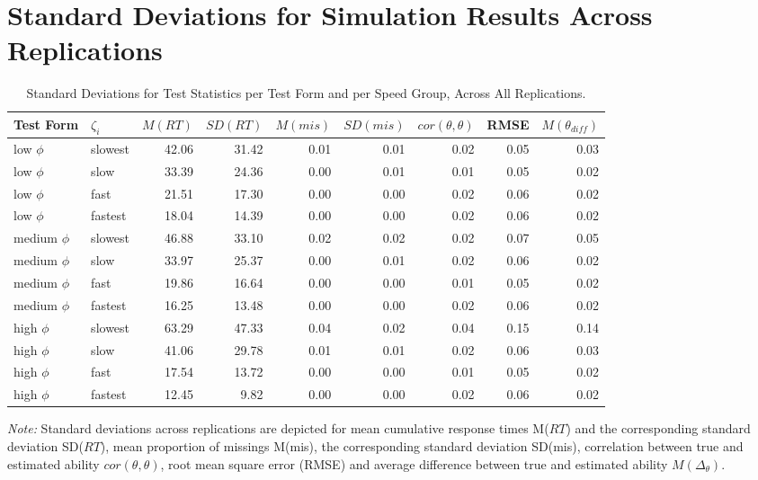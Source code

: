 \documentclass[a4paper,man,apacite,donotrepeattitle]{apa6}
\begin{document}
\section{Standard Deviations for Simulation Results Across Replications}
\begin{table}
\centering
\caption{Standard Deviations for Test Statistics per Test Form and per Speed Group, Across All Replications.}
\begin{tabular}{llrrrrrrr}
  \hline
Test Form & $\zeta_{i}$ & $M(RT)$ & $SD(RT)$ & $M(mis)$ & $SD(mis)$ & $cor(\theta, \theta)$ & RMSE & $M(\theta_{diff})$ \\ 
  \hline
low $\phi$ & slowest & 42.06 & 31.42 & 0.01 & 0.01 & 0.02 & 0.05 & 0.03 \\ 
  low $\phi$ & slow & 33.39 & 24.36 & 0.00 & 0.01 & 0.01 & 0.05 & 0.02 \\ 
  low $\phi$ & fast & 21.51 & 17.30 & 0.00 & 0.00 & 0.02 & 0.06 & 0.02 \\ 
  low $\phi$ & fastest & 18.04 & 14.39 & 0.00 & 0.00 & 0.02 & 0.06 & 0.02 \\ 
  medium $\phi$ & slowest & 46.88 & 33.10 & 0.02 & 0.02 & 0.02 & 0.07 & 0.05 \\ 
  medium $\phi$ & slow & 33.97 & 25.37 & 0.00 & 0.01 & 0.02 & 0.06 & 0.02 \\ 
  medium $\phi$ & fast & 19.86 & 16.64 & 0.00 & 0.00 & 0.01 & 0.05 & 0.02 \\ 
  medium $\phi$ & fastest & 16.25 & 13.48 & 0.00 & 0.00 & 0.02 & 0.06 & 0.02 \\ 
  high $\phi$ & slowest & 63.29 & 47.33 & 0.04 & 0.02 & 0.04 & 0.15 & 0.14 \\ 
  high $\phi$ & slow & 41.06 & 29.78 & 0.01 & 0.01 & 0.02 & 0.06 & 0.03 \\ 
  high $\phi$ & fast & 17.54 & 13.72 & 0.00 & 0.00 & 0.01 & 0.05 & 0.02 \\ 
  high $\phi$ & fastest & 12.45 & 9.82 & 0.00 & 0.00 & 0.02 & 0.06 & 0.02 \\ 
   \hline
\end{tabular}
\begin{tablenotes}
\vspace{0.1cm}
\small
    \textit{Note:} Standard deviations across replications are depicted for mean cumulative response times M($RT$) and the corresponding standard deviation SD($RT$), mean proportion of missings M(mis), the corresponding standard deviation SD(mis), correlation between true and estimated ability $cor(\theta, \theta)$, root mean square error (RMSE) and average difference between true and estimated ability $M(\Delta_{\theta})$. 
\end{tablenotes}
\label{tab:descr}

\end{table}


\begin{flushleft}

\end{flushleft}
\end{document}
